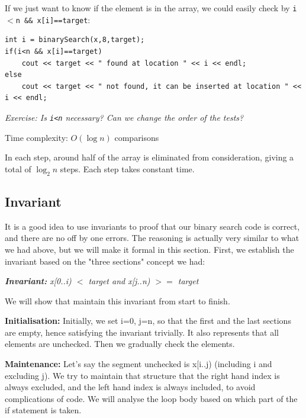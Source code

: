 If we just want to know if the element is in the array, we could easily check by \texttt{i$<$n \&\& x[i]==target}:

\begin{lstlisting}
int i = binarySearch(x,8,target);
if(i<n && x[i]==target)
    cout << target << " found at location " << i << endl;
else 
    cout << target << " not found, it can be inserted at location " << i << endl;
\end{lstlisting}

\textit{Exercise: Is \texttt{i<n} necessary? Can we change the order of the tests?}
\vspace{6mm}

Time complexity: $O(\log n)$ comparisons
\vspace{6mm}

In each step, around half of the array is eliminated from consideration, giving a total of $\log_2 n$ steps. Each step takes constant time.

\if{}

\subsection*{Invariant}

It is a good idea to use invariants to proof that our binary search code is correct, and there are no off by one errors. The reasoning is actually very similar to what we had above, but we will make it formal in this section. First, we establish the invariant based on the "three sections" concept we had: 

\begin{center}
    \textit{\textbf{Invariant:}\hspace{6mm} x[0..i) $<$ target and x[j..n) $>=$ target}
\end{center}

We will show that maintain this invariant from start to finish. 
\vspace{6mm}

\textbf{Initialisation:} Initially, we set i=0, j=n, so that the first and the last sections are empty, hence satisfying the invariant trivially. It also represents that all elements are unchecked. Then we gradually check the elements.
\vspace{6mm}

\textbf{Maintenance:} Let's say the segment unchecked is x[i..j) (including i and excluding j). We try to maintain that structure that the right hand index is always excluded, and the left hand index is always included, to avoid complications of code. We will analyse the loop body based on which part of the if statement is taken.

